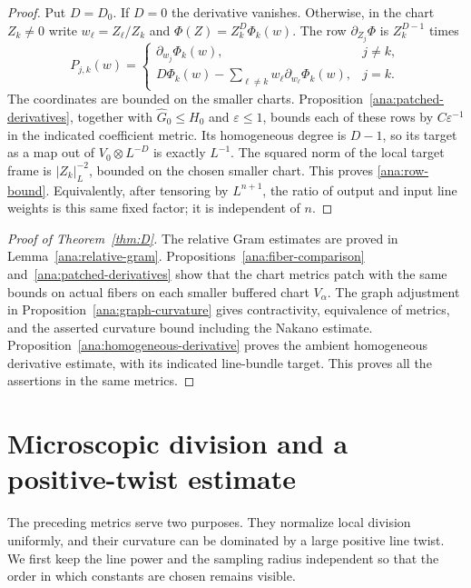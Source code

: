 \documentclass[11pt,reqno]{amsart}
\numberwithin{equation}{section}
\theoremstyle{definition}
\theoremstyle{remark}
\begin{document}
\begin{proof}
Put $D=D_0$.  If $D=0$ the derivative vanishes.  Otherwise, in the
chart $Z_k\neq0$ write $w_\ell=Z_\ell/Z_k$ and
$\Phi(Z)=Z_k^D\Phi_k(w)$.  The row $\partial_{Z_j}\Phi$ is
$Z_k^{D-1}$ times
\[
 P_{j,k}(w)=
 \begin{cases}
  \partial_{w_j}\Phi_k(w),&j\neq k,\\
  D\Phi_k(w)-\displaystyle\sum_{\ell\neq k}
       w_\ell\partial_{w_\ell}\Phi_k(w),&j=k.
 \end{cases}
\]
The coordinates are bounded on the smaller charts.
Proposition~\ref{ana:patched-derivatives}, together with
$\widehat G_0\leq H_0$ and $\varepsilon\leq1$, bounds each of these
rows by $C\varepsilon^{-1}$ in the indicated coefficient metric.
Its homogeneous degree is $D-1$, so its target as a map out of
$V_0\otimes L^{-D}$ is exactly $L^{-1}$.
The squared norm of the local target frame is $|Z_k|_L^{-2}$,
bounded on the chosen smaller chart.  This proves
\eqref{ana:row-bound}.  Equivalently, after tensoring by $L^{n+1}$,
the ratio of output and input line weights is this same fixed factor;
it is independent of $n$.
\end{proof}

\begin{proof}[Proof of Theorem~\ref{thm:D}]
The relative Gram estimates are proved in Lemma~\ref{ana:relative-gram}.
Propositions~\ref{ana:fiber-comparison} and~\ref{ana:patched-derivatives}
show that the chart metrics patch with the same bounds on actual fibers
on each smaller buffered chart $V_\alpha$.
The graph adjustment in Proposition~\ref{ana:graph-curvature} gives
contractivity, equivalence of metrics, and the asserted curvature bound
including the Nakano estimate. Proposition~\ref{ana:homogeneous-derivative}
proves the ambient homogeneous derivative estimate, with its indicated
line-bundle target. This proves all the assertions in the same metrics.
\end{proof}

\section{Microscopic division and a positive-twist estimate}
\label{ana:local-and-global}

The preceding metrics serve two purposes.  They normalize local
division uniformly, and their curvature can be dominated by a large
positive line twist.  We first keep the line power and the sampling
radius independent so that the order in which constants are chosen
remains visible.
\end{document}

